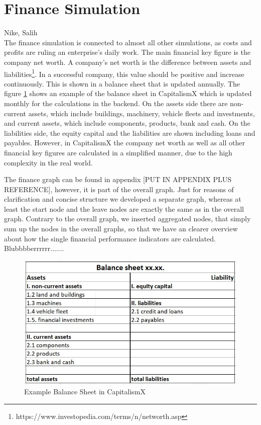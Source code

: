 \section{Finance Simulation}
\label{sec:finance_simulation}
Nike, Salih\\

The finance simulation is connected to almost all other simulations, as costs and profits are ruling an enterprise's daily work. The main financial key figure is the company net worth. A company's net worth is the difference between assets and liabilities\footnote{https://www.investopedia.com/terms/n/networth.asp}. In a successful company, this value should be positive and increase continuously. This is shown in a balance sheet that is updated annually. The figure \ref{fig:BalanceSheet} shows an example of the balance sheet in CapitalismX which is updated monthly for the calculations in the backend. On the assets side there are non-current assets, which include buildings, machinery, vehicle fleets and investments, and current assets, which include components, products, bank and cash. On the liabilities side, the equity capital and the liabilities are shown including loans and payables. However, in CapitalismX the company net worth as well as all other financial key figures are calculated in a simplified manner, due to the high complexity in the real world.

The finance graph can be found in appendix [PUT IN APPENDIX PLUS REFERENCE], however, it is part of the overall graph. Just for reasons of clarification and concise structure we developed a separate graph, whereas at least the start node and the leave nodes are exactly the same as in the overall graph. Contrary to the overall graph, we inserted aggregated nodes, that simply sum up the nodes in the overall graphs, so that we have an clearer overview about how the single financial performance indicators are calculated. Blubbbberrrrrr.......


\begin{figure}
\label{fig:BalanceSheet}
	\centering
	\includegraphics[width=12cm]{images/balance sheet.JPG}
	\caption{Example Balance Sheet in CapitalismX}
\end{figure}

